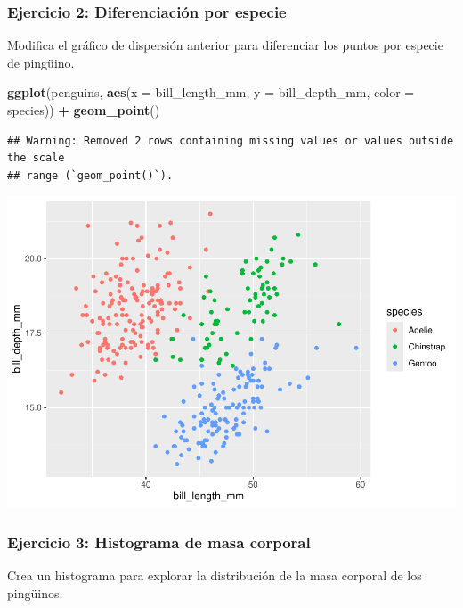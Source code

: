 \documentclass[
]{book}
\newenvironment{Shaded}{\begin{snugshade}}{\end{snugshade}}
\newcommand{\AttributeTok}[1]{\textcolor[rgb]{0.13,0.29,0.53}{#1}}
\newcommand{\FunctionTok}[1]{\textcolor[rgb]{0.13,0.29,0.53}{\textbf{#1}}}
\newcommand{\NormalTok}[1]{#1}
\newcommand{\SpecialCharTok}[1]{\textcolor[rgb]{0.81,0.36,0.00}{\textbf{#1}}}
\begin{document}
\subsubsection{Ejercicio 2: Diferenciación por especie}\label{ejercicio-2-diferenciaciuxf3n-por-especie}

Modifica el gráfico de dispersión anterior para diferenciar los puntos por especie de pingüino.

\begin{Shaded}
\begin{Highlighting}[]
\FunctionTok{ggplot}\NormalTok{(penguins, }\FunctionTok{aes}\NormalTok{(}\AttributeTok{x =}\NormalTok{ bill\_length\_mm, }\AttributeTok{y =}\NormalTok{ bill\_depth\_mm, }\AttributeTok{color =}\NormalTok{ species)) }\SpecialCharTok{+}
  \FunctionTok{geom\_point}\NormalTok{()}
\end{Highlighting}
\end{Shaded}

\begin{verbatim}
## Warning: Removed 2 rows containing missing values or values outside the scale
## range (`geom_point()`).
\end{verbatim}

\includegraphics{bookdown-demo_files/figure-latex/unnamed-chunk-182-1.pdf}

\subsubsection{Ejercicio 3: Histograma de masa corporal}\label{ejercicio-3-histograma-de-masa-corporal}

Crea un histograma para explorar la distribución de la masa corporal de los pingüinos.
\end{document}
